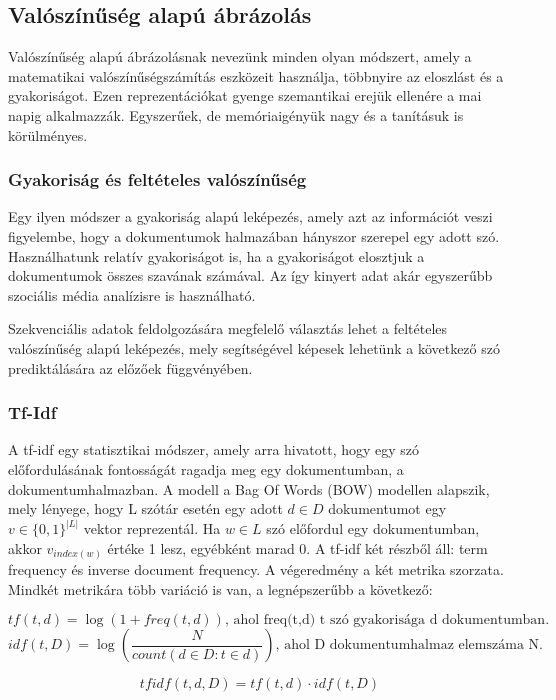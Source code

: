\subsection{Valószínűség alapú ábrázolás}

Valószínűség alapú ábrázolásnak nevezünk minden olyan módszert, amely a matematikai valószínűségszámítás eszközeit használja, többnyire az eloszlást és a gyakoriságot. Ezen reprezentációkat gyenge szemantikai erejük ellenére a mai napig alkalmazzák. Egyszerűek, de memóriaigényük nagy és a tanításuk is körülményes.

\subsubsection{Gyakoriság és feltételes valószínűség}

Egy ilyen módszer a gyakoriság alapú leképezés, amely azt az információt veszi figyelembe, hogy a dokumentumok halmazában hányszor szerepel egy adott szó. Használhatunk relatív gyakoriságot is, ha a gyakoriságot elosztjuk a dokumentumok összes szavának számával. Az így kinyert adat akár egyszerűbb szociális média analízisre is használható.

Szekvenciális adatok feldolgozására megfelelő választás lehet a feltételes valószínűség alapú leképezés, mely segítségével képesek lehetünk a következő szó prediktálására az előzőek függvényében.


\subsubsection{Tf-Idf}

A tf-idf egy statisztikai módszer, amely arra hivatott, hogy egy szó előfordulásának fontosságát ragadja meg egy dokumentumban, a dokumentumhalmazban. A modell a Bag Of Words (BOW) modellen alapszik, mely lényege, hogy L szótár esetén egy adott $d \in D$ dokumentumot egy $v \in \{0,1\}^{|L|}$ vektor reprezentál. Ha $w \in L$ szó előfordul egy dokumentumban, akkor $v_{index(w)}$ értéke 1 lesz, egyébként marad 0. A tf-idf két részből áll: term frequency és inverse document frequency. A végeredmény a két metrika szorzata. Mindkét metrikára több variáció is van, a legnépszerűbb a következő:

\begin{definition}
$$tf\left(t,d\right) = \log \left( 1 + freq\left(t,d\right)\right) \text{, ahol freq(t,d) t szó gyakorisága d dokumentumban.}$$
$$idf\left(t,D\right) = \log \left( \frac{N}{count \left( d \in D:t \in d \right) } \right) \text{, ahol D dokumentumhalmaz elemszáma N.}$$

$$tfidf(t,d,D) = tf(t,d) \cdot idf(t,D)$$

\end{definition}


